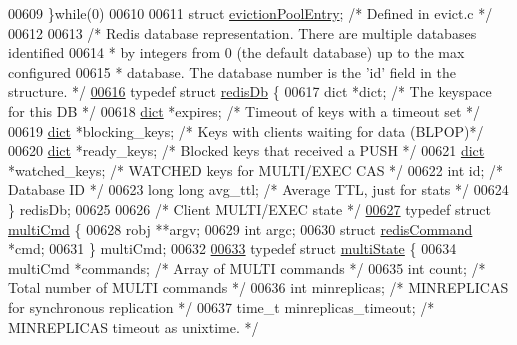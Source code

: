 \begin{DoxyCode}
{{{{{{00609 \textcolor{preprocessor}{\}}\textcolor{keywordflow}{while}\textcolor{preprocessor}{(}0\textcolor{preprocessor}{)}
00610 
00611 \textcolor{keyword}{struct} \hyperlink{structevictionPoolEntry}{evictionPoolEntry}; \textcolor{comment}{/* Defined in evict.c */}
00612 
00613 \textcolor{comment}{/* Redis database representation. There are multiple databases identified}
00614 \textcolor{comment}{ * by integers from 0 (the default database) up to the max configured}
00615 \textcolor{comment}{ * database. The database number is the 'id' field in the structure. */}
\hyperlink{structredisDb}{00616} \textcolor{keyword}{typedef} \textcolor{keyword}{struct} \hyperlink{structredisDb}{redisDb} \{
00617     dict *dict;                 \textcolor{comment}{/* The keyspace for this DB */}
00618     \hyperlink{structdict}{dict} *expires;              \textcolor{comment}{/* Timeout of keys with a timeout set */}
00619     \hyperlink{structdict}{dict} *blocking\_keys;        \textcolor{comment}{/* Keys with clients waiting for data (BLPOP)*/}
00620     \hyperlink{structdict}{dict} *ready\_keys;           \textcolor{comment}{/* Blocked keys that received a PUSH */}
00621     \hyperlink{structdict}{dict} *watched\_keys;         \textcolor{comment}{/* WATCHED keys for MULTI/EXEC CAS */}
00622     \textcolor{keywordtype}{int} id;                     \textcolor{comment}{/* Database ID */}
00623     \textcolor{keywordtype}{long} \textcolor{keywordtype}{long} avg\_ttl;          \textcolor{comment}{/* Average TTL, just for stats */}
00624 \} redisDb;
00625 
00626 \textcolor{comment}{/* Client MULTI/EXEC state */}
\hyperlink{structmultiCmd}{00627} \textcolor{keyword}{typedef} \textcolor{keyword}{struct} \hyperlink{structmultiCmd}{multiCmd} \{
00628     robj **argv;
00629     \textcolor{keywordtype}{int} argc;
00630     \textcolor{keyword}{struct} \hyperlink{structredisCommand}{redisCommand} *cmd;
00631 \} multiCmd;
00632 
\hyperlink{structmultiState}{00633} \textcolor{keyword}{typedef} \textcolor{keyword}{struct} \hyperlink{structmultiState}{multiState} \{
00634     multiCmd *commands;     \textcolor{comment}{/* Array of MULTI commands */}
00635     \textcolor{keywordtype}{int} count;              \textcolor{comment}{/* Total number of MULTI commands */}
00636     \textcolor{keywordtype}{int} minreplicas;        \textcolor{comment}{/* MINREPLICAS for synchronous replication */}
00637     time\_t minreplicas\_timeout; \textcolor{comment}{/* MINREPLICAS timeout as unixtime. */}
}}}}}}
\end{DoxyCode}
